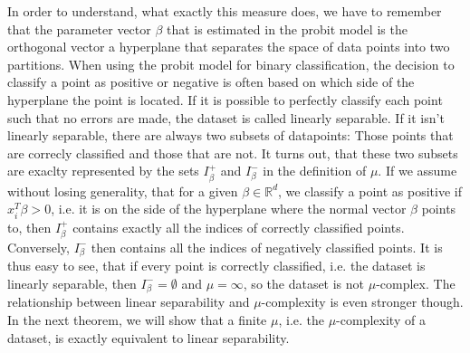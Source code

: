 In order to understand, what exactly this measure does, we have to
remember that the parameter vector $\beta$ that is estimated in
the probit model is the orthogonal vector a hyperplane that separates the
space of data points into two partitions.
When using the probit model for binary classification,
the decision to classify a point as positive or negative is often
based on which side of the hyperplane the point is located.
If it is possible to perfectly classify each point such that no
errors are made, the dataset is called linearly separable.
If it isn't linearly separable, there are always two subsets of
datapoints: Those points that are correcly classified and those that
are not. It turns out, that these two subsets are exaclty represented
by the sets $I_\beta^+$ and $I_\beta^-$ in the definition of $\mu$.
If we assume without losing generality, that for a given
$\beta \in \mathbb{R}^d$, we classify a point as
positive if $x_i^T \beta > 0$, i.e. it is on the side
of the hyperplane where the normal vector $\beta$ points to,
then $I_\beta^+$
contains exactly all the indices of correctly classified points.
Conversely, $I_\beta^-$ then contains all the indices of negatively
classified points.
It is thus easy to see, that if every point is correctly classified,
i.e. the dataset is linearly separable,
then $I_\beta^- = \emptyset$ and $\mu = \infty$, so the dataset
is not $\mu$-complex.
The relationship between linear separability and
$\mu$-complexity is even stronger though. In the next theorem,
we will show that a finite $\mu$, i.e. the $\mu$-complexity
of a dataset, is exactly equivalent to linear separability.

